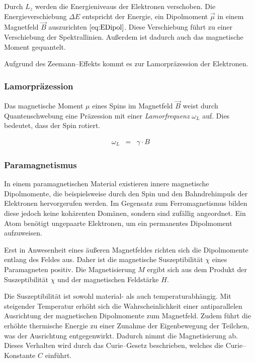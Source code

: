 \documentclass[12pt,a4paper]{scrartcl}
\numberwithin{equation}{section} %
\begin{document}
Durch $L_z$ werden die Energieniveaus der Elektronen verschoben. Die Energieverschiebung $\Delta E$ entspricht der Energie, ein Dipolmoment $\vec \mu$ in einem Magnetfeld $\vec B$ auszurichten $\eqref{eq:EDipol}$. Diese Verschiebung führt zu einer Verschiebung der Spektrallinien. Außerdem ist dadurch auch das magnetische Moment gequantelt.

Aufgrund des Zeemann--Effekts kommt es zur Lamorpräzession der Elektronen.

\hypertarget{lamorpruxe4zession}{%
	\subsubsection{Lamorpräzession}\label{lamorpruxe4zession}}

Das magnetische Moment $\mu$ eines Spins im Magnetfeld $\vec{B}$ weist durch Quantenschwebung eine Präzession mit einer \emph{Lamorfrequenz} $\omega_L$ auf. Dies bedeutet, dass der Spin rotiert.

\begin{eqnarray}
	\omega_L &=& \gamma\cdot B
\end{eqnarray}

\subsubsection{Paramagnetismus}
\label{Paramagnetismus}

In einem paramagnetischen Material existieren innere magnetische Dipolmomente, die beispielsweise durch den Spin und den Bahndrehimpuls der Elektronen hervorgerufen werden. Im Gegensatz zum Ferromagnetismus bilden diese jedoch keine kohärenten Domänen, sondern sind zufällig angeordnet. Ein Atom benötigt ungepaarte Elektronen, um ein permanentes Dipolmoment aufzuweisen.

Erst in Anwesenheit eines äußeren Magnetfeldes richten sich die Dipolmomente entlang des Feldes aus. Daher ist die magnetische Suszeptibilität $\chi$ eines Paramagneten positiv. Die Magnetisierung $M$ ergibt sich aus dem Produkt der Suszeptibilität $\chi$ und der magnetischen Feldstärke $H$.

Die Suszeptibilität ist sowohl material- als auch temperaturabhängig. Mit steigender Temperatur erhöht sich die Wahrscheinlichkeit einer antiparallelen Ausrichtung der magnetischen Dipolmomente zum Magnetfeld. Zudem führt die erhöhte thermische Energie zu einer Zunahme der Eigenbewegung der Teilchen, was der Ausrichtung entgegenwirkt. Dadurch nimmt die Magnetisierung ab. Dieses Verhalten wird durch das Curie--Gesetz beschrieben, welches die Curie--Konstante $C$ einführt.
\end{document}

